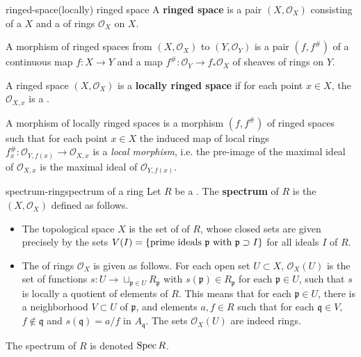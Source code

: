 \begin{topic}{ringed-space}{(locally) ringed space}
    A \textbf{ringed space} is a pair $(X, \mathcal{O}_X)$ consisting of a  $X$ and a  of rings $\mathcal{O}_X$ on $X$.
    
    A morphism of ringed spaces from $(X, \mathcal{O}_X)$ to $(Y, \mathcal{O}_Y)$ is a pair $(f, f^\#)$ of a continuous map $f : X \to Y$ and a map $f^\# : \mathcal{O}_Y \to f_* \mathcal{O}_X$ of sheaves of rings on $Y$.
    
    A ringed space $(X, \mathcal{O}_X)$ is a \textbf{locally ringed space} if for each point $x \in X$, the  $\mathcal{O}_{X,x}$ is a .
    
    A morphism of locally ringed spaces is a morphism $(f, f^\#)$ of ringed spaces such that for each point $x \in X$ the induced map of local rings $f^\#_x : \mathcal{O}_{Y, f(x)} \to \mathcal{O}_{X, x}$ is a \textit{local morphism}, i.e. the pre-image of the maximal ideal of $\mathcal{O}_{X, x}$ is the maximal ideal of $\mathcal{O}_{Y, f(x)}$.
\end{topic}

\begin{topic}{spectrum-ring}{spectrum of a ring}
    Let $R$ be a . The \textbf{spectrum} of $R$ is the  $(X, \mathcal{O}_X)$ defined as follows.
    \begin{itemize}
        \item The topological space $X$ is the set of  of $R$, whose closed sets are given precisely by the sets $V(I) = \{ \textup{prime ideals } \mathfrak{p} \textup{ with } \mathfrak{p} \supset I \}$ for all ideals $I$ of $R$.
        
        \item The  of rings $\mathcal{O}_X$ is given as follows. For each open set $U \subset X$, $\mathcal{O}_X(U)$ is the set of functions $s : U \to \sqcup_{\mathfrak{p} \in U} R_\mathfrak{p}$ with $s(\mathfrak{p}) \in R_\mathfrak{p}$ for each $\mathfrak{p} \in U$, such that $s$ is locally a quotient of elements of $R$. This means that for each $\mathfrak{p} \in U$, there is a neighborhood $V \subset U$ of $\mathfrak{p}$, and elements $a, f \in R$ such that for each $\mathfrak{q} \in V$, $f \not\in \mathfrak{q}$ and $s(\mathfrak{q}) = a/f$ in $A_\mathfrak{q}$. The sets $\mathcal{O}_X(U)$ are indeed rings.
    \end{itemize}
    The spectrum of $R$ is denoted $\operatorname{Spec} R$.
\end{topic}

